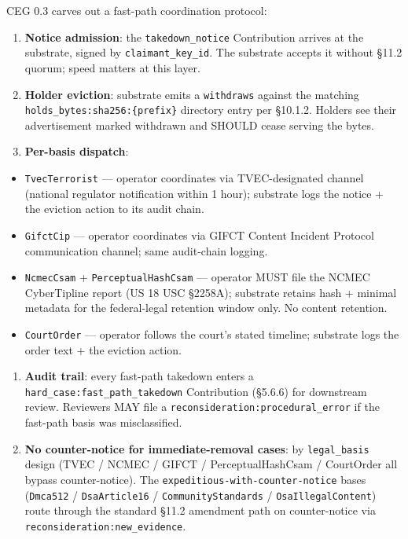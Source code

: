 \documentclass[11pt]{article}
\begin{document}
CEG 0.3 carves out a fast-path coordination protocol:


\begin{enumerate}\setlength\itemsep{0pt}
\item \textbf{Notice admission}: the \texttt{takedown\_notice} Contribution arrives at the substrate, signed by \texttt{claimant\_key\_id}. The substrate accepts it without §11.2 quorum; speed matters at this layer.
\item \textbf{Holder eviction}: substrate emits a \texttt{withdraws} against the matching \texttt{holds\_bytes:sha256:\{prefix\}} directory entry per §10.1.2. Holders see their advertisement marked withdrawn and SHOULD cease serving the bytes.
\item \textbf{Per-basis dispatch}:
\end{enumerate}

\begin{itemize}\setlength\itemsep{0pt}
\item \texttt{TvecTerrorist} — operator coordinates via TVEC-designated channel (national regulator notification within 1 hour); substrate logs the notice + the eviction action to its audit chain.
\item \texttt{GifctCip} — operator coordinates via GIFCT Content Incident Protocol communication channel; same audit-chain logging.
\item \texttt{NcmecCsam} + \texttt{PerceptualHashCsam} — operator MUST file the NCMEC CyberTipline report (US 18 USC §2258A); substrate retains hash + minimal metadata for the federal-legal retention window only. No content retention.
\item \texttt{CourtOrder} — operator follows the court's stated timeline; substrate logs the order text + the eviction action.
\end{itemize}

\begin{enumerate}\setlength\itemsep{0pt}
\item \textbf{Audit trail}: every fast-path takedown enters a \texttt{hard\_case:fast\_path\_takedown} Contribution (§5.6.6) for downstream review. Reviewers MAY file a \texttt{reconsideration:procedural\_error} if the fast-path basis was misclassified.
\item \textbf{No counter-notice for immediate-removal cases}: by \texttt{legal\_basis} design (TVEC / NCMEC / GIFCT / PerceptualHashCsam / CourtOrder all bypass counter-notice). The \texttt{expeditious-with-counter-notice} bases (\texttt{Dmca512} / \texttt{DsaArticle16} / \texttt{CommunityStandards} / \texttt{OsaIllegalContent}) route through the standard §11.2 amendment path on counter-notice via \texttt{reconsideration:new\_evidence}.
\end{enumerate}
\end{document}
